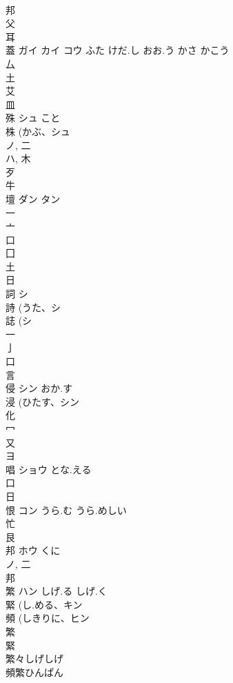 \documentclass[8pt]{extreport}
\begin{document}
\begin{CJK}{UTF8}{min}
\\	邦 
\\	父 
\\	耳 
\\	蓋	ガイ カイ コウ	ふた けだ.し おお.う かさ かこう	
\\	厶 
\\	土 
\\	艾 
\\	皿 
\\	殊	シュ	こと	
\\	株 (かぶ、シュ 
\\	ノ, 二 
\\	ハ, 木 
\\	歹 
\\	牛 
\\	壇	ダン タン		
\\	一 
\\	亠 
\\	口 
\\	囗 
\\	土 
\\	日 
\\	詞	シ		
\\	詩 (うた、シ 
\\	誌 (シ 
\\	一 
\\	亅 
\\	口 
\\	言 
\\	侵	シン	おか.す	
\\	浸 (ひたす、シン 
\\	化 
\\	冖 
\\	又 
\\	ヨ	
\\	唱	ショウ	とな.える	
\\	口 
\\	日 
\\	恨	コン	うら.む うら.めしい	
\\	忙 
\\	艮 
\\	邦	ホウ	くに	
\\	ノ, 二 
\\	邦 
\\	繁	ハン	しげ.る しげ.く	
\\	緊 (し.める、キン 
\\	頻 (しきりに、ヒン 
\\	繁 
\\	緊 
\\	繁々しげしげ
\\	頻繁ひんぱん

\end{CJK}
\end{document}
